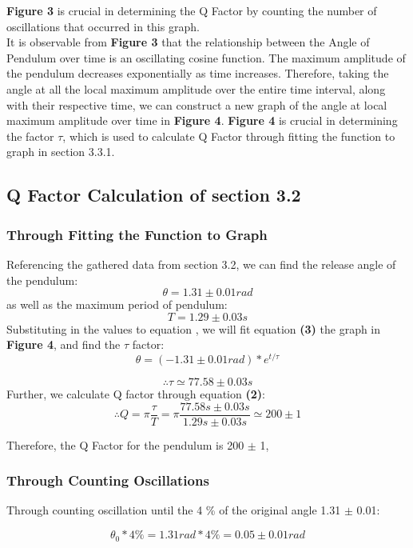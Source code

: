\documentclass{article}
\begin{document}
\textbf{Figure 3} is crucial in determining the Q Factor by counting the number of oscillations that occurred in this graph. \\
\indent It is observable from \textbf{Figure 3} that the relationship between the Angle of Pendulum over time is an oscillating cosine function. The maximum amplitude of the pendulum decreases exponentially as time increases. Therefore, taking the angle at all the local maximum amplitude over the entire time interval, along with their respective time, we can construct a new graph of the angle at local maximum amplitude over time in \textbf{Figure 4}. \textbf{Figure 4} is crucial in determining the factor $\tau$, which is used to calculate Q Factor through fitting the function to graph in section 3.3.1.

\subsection{Q Factor Calculation of section 3.2}

\subsubsection{Through Fitting the Function to Graph}

Referencing the gathered data from section 3.2, we can find the release angle of the pendulum:
$$ \theta = 1.31 \pm 0.01rad $$
as well as the maximum period of pendulum:
$$ T = 1.29 \pm 0.03s $$
Substituting in the values to equation , we will fit equation \textbf{(3)} the graph in \textbf{Figure 4}, and find the $\tau$ factor:
\begin{equation}
 \theta = (-1.31 \pm0.01rad) * e^{t/\tau} 
\end{equation}

$$ \therefore \tau \simeq 77.58 \pm 0.03s $$
Further, we calculate Q factor through equation \textbf{(2)}:
$$ \therefore Q=\pi \frac{\tau}{T}=\pi \frac{77.58s \pm 0.03s}{1.29s \pm 0.03s} \simeq 200 \pm 1$$

\noindent Therefore, the Q Factor for the pendulum is 200 $\pm$ 1,
\subsubsection{Through Counting Oscillations}

Through counting oscillation until the 4 \% of the original angle 1.31 $\pm$ 0.01:

\[ \theta_0 * 4 \% = 1.31 rad * 4 \% = 0.05 \pm 0.01 rad \]
\end{document}
